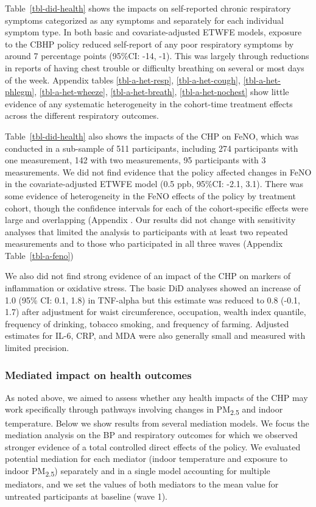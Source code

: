 \documentclass[
  letterpaper,
  DIV=11,
  numbers=noendperiod]{scrartcl}
\begin{document}
Table~\ref{tbl-did-health} shows the impacts on self-reported chronic
respiratory symptoms categorized as any symptoms and separately for each
individual symptom type. In both basic and covariate-adjusted ETWFE
models, exposure to the CBHP policy reduced self-report of any poor
respiratory symptoms by around 7 percentage points (95\%CI: -14, -1).
This was largely through reductions in reports of having chest trouble
or difficulty breathing on several or most days of the week. Appendix
tables \ref{tbl-a-het-resp}, \ref{tbl-a-het-cough},
\ref{tbl-a-het-phlegm}, \ref{tbl-a-het-wheeze}, \ref{tbl-a-het-breath},
\ref{tbl-a-het-nochest} show little evidence of any systematic
heterogeneity in the cohort-time treatment effects across the different
respiratory outcomes.

Table~\ref{tbl-did-health} also shows the impacts of the CHP on FeNO,
which was conducted in a sub-sample of 511 participants, including 274
participants with one measurement, 142 with two measurements, 95
participants with 3 measurements. We did not find evidence that the
policy affected changes in FeNO in the covariate-adjusted ETWFE model
(0.5 ppb, 95\%CI: -2.1, 3.1). There was some evidence of heterogeneity
in the FeNO effects of the policy by treatment cohort, though the
confidence intervals for each of the cohort-specific effects were large
and overlapping (Appendix . Our results did not change with sensitivity
analyses that limited the analysis to participants with at least two
repeated measurements and to those who participated in all three waves
(Appendix Table~\ref{tbl-a-feno})

We  also did not find strong evidence of an impact of the
CHP on markers of inflammation or oxidative stress. The basic DiD
analyses showed an increase of 1.0 (95\% CI: 0.1, 1.8) in TNF-alpha but
this estimate was reduced to 0.8 (-0.1, 1.7) after adjustment for waist
circumference, occupation, wealth index quantile, frequency of drinking,
tobacco smoking, and frequency of farming. Adjusted estimates for IL-6,
CRP, and MDA were also generally small and measured with limited
precision.

\subsubsection{Mediated impact on health
outcomes}\label{mediated-impact-on-health-outcomes}

As noted above, we aimed to assess whether any health impacts of the CHP
may work specifically through pathways involving changes in
PM\textsubscript{2.5} and indoor temperature. Below we show results from
several mediation models. We focus the mediation analysis on the BP and
respiratory outcomes for which we observed stronger evidence of a total
controlled direct effects of the policy. We evaluated potential
mediation for each mediator (indoor temperature and exposure to indoor
PM\textsubscript{2.5}) separately and in a single model accounting for
multiple mediators, and we set the values of both mediators to the mean
value for untreated participants at baseline (wave 1).
\end{document}
